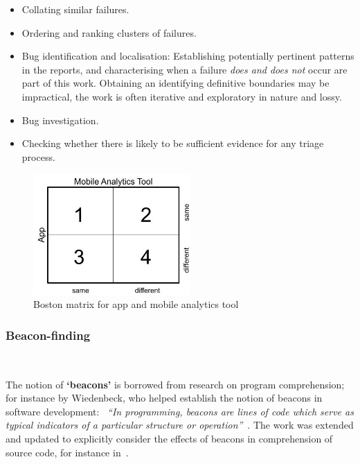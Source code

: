  \begin{itemize}
    \itemsep0em
    \item Collating similar failures.
    \item Ordering and ranking clusters of failures.
    \item Bug identification and localisation: Establishing potentially pertinent patterns in the reports, and characterising when a failure \emph{does and does not} occur are part of this work. Obtaining an identifying definitive boundaries may be impractical, the work is often iterative and exploratory in nature and lossy. 
    \item Bug investigation.
    \item Checking whether there is likely to be sufficient evidence for any triage process.
\end{itemize}

\begin{figure}
    \centering
    \includegraphics[width=6cm]{images/my/Boston-matrix-app-and-mobile-analytics-tool.jpeg}
    \caption{Boston matrix for app and mobile analytics tool}
    \label{fig:boston-matrix-app-and-mobile-analytics-tool}
\end{figure}

\subsubsection{Beacon-finding}~\label{section-beacon-finding-method}

The notion of \textbf{`beacons'} is borrowed from research on program comprehension; for instance by Wiedenbeck, who helped establish the notion of beacons in software development: ~\emph{``In programming, beacons are lines of code which serve as typical indicators of a particular structure or operation''}~. The work was extended and updated to explicitly consider the effects of beacons in comprehension of source code, for instance in~.

